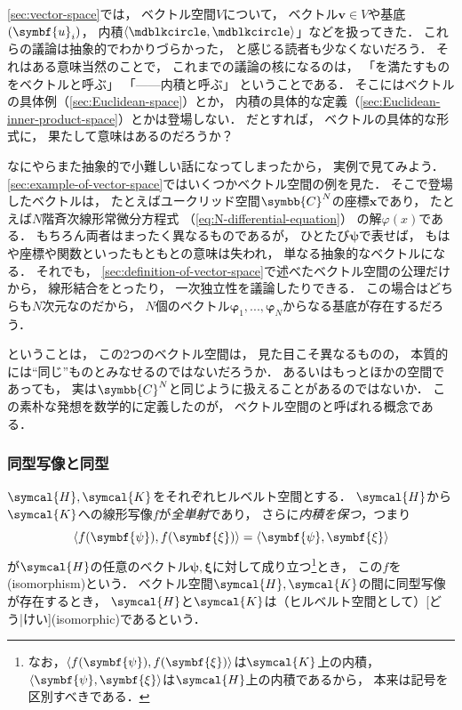 \documentclass[
]{sotsu}
\newcommand{\bpsi}{\symbf{\psi}}
\newcommand{\bphi}{\symbf{\varphi}}
\newcommand{\bxi}{\symbf{\xi}}
\begin{document}
\cref{sec:vector-space}では，
ベクトル空間$V$について，
ベクトル$\symbf{v} \in V$や基底$\sequ{\symbf{u}_i}$，
内積$\iparen{\bigdot, \bigdot}$」などを扱ってきた．
これらの議論は抽象的でわかりづらかった，
と感じる読者も少なくないだろう．
それはある意味当然のことで，
これまでの議論の核になるのは，
「を満たすものをベクトルと呼ぶ」
「------内積と呼ぶ」
ということである．
そこにはベクトルの具体例（\cref{sec:Euclidean-space}）とか，
内積の具体的な定義（\cref{sec:Euclidean-inner-product-space}）とかは登場しない．
だとすれば，
ベクトルの具体的な形式に，
果たして意味はあるのだろうか？

なにやらまた抽象的で小難しい話になってしまったから，
実例で見てみよう．
\cref{sec:example-of-vector-space}ではいくつかベクトル空間の例を見た．
そこで登場したベクトルは，
たとえばユークリッド空間$\symbb{C}^N$の座標$\symbf{x}$であり，
たとえば$N$階斉次線形常微分方程式
（\cref{eq:N-differential-equation}）
の解$\varphi(x)$である．
もちろん両者はまったく異なるものであるが，
ひとたび$\bpsi$で表せば，
もはや座標や関数といったもともとの意味は失われ，
単なる抽象的なベクトルになる．
それでも，
\cref{sec:definition-of-vector-space}で述べたベクトル空間の公理だけから，
線形結合をとったり，
一次独立性を議論したりできる．
この場合はどちらも$N$次元なのだから，
$N$個のベクトル$\bphi_1, ..., \bphi_N$からなる基底が存在するだろう．

ということは，
この2つのベクトル空間は，
見た目こそ異なるものの，
本質的には``同じ''ものとみなせるのではないだろうか．
あるいはもっとほかの空間であっても，
実は$\symbb{C}^N$と同じように扱えることがあるのではないか．
この素朴な発想を数学的に定義したのが，
ベクトル空間のと呼ばれる概念である．





\subsubsection{同型写像と同型}

$\symcal{H}, \symcal{K}$をそれぞれヒルベルト空間とする．
$\symcal{H}$から$\symcal{K}$への線形写像$f$が\emph{全単射}であり，
さらに\emph{内積を保つ}，つまり
\begin{equation*}
    \iparen{f(\bpsi), f(\bxi)} = \iparen{\bpsi, \bxi}
\end{equation*}
が$\symcal{H}$の任意のベクトル$\bpsi, \bxi$に対して成り立つ\footnote{
    なお，$\iparen{f(\bpsi), f(\bxi)}$は$\symcal{K}$上の内積，
    $\iparen{\bpsi, \bxi}$は$\symcal{H}$上の内積であるから，
    本来は記号を区別すべきである．
}とき，
この$f$を(isomorphism)という．
ベクトル空間$\symcal{H}, \symcal{K}$の間に同型写像が存在するとき，
$\symcal{H}$と$\symcal{K}$は（ヒルベルト空間として）[どう|けい](isomorphic)であるという．
\end{document}
